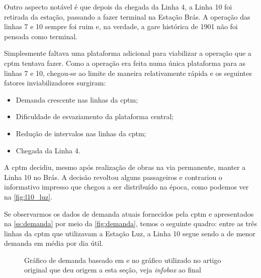 \documentclass[11pt,fleqn]{book} %
\begin{document}
Outro aspecto notável é que depois da chegada da Linha 4, a Linha 10 foi retirada da estação, passando a fazer terminal na Estação Brás. A operação das linhas 7 e 10 sempre foi ruim e, na verdade, a gare histórica de 1901 não foi pensada como terminal.

Simplesmente faltava uma plataforma adicional para viabilizar a operação que a \gls{cptm} tentava fazer. Como a operação era feita numa única plataforma para as linhas 7 e 10, chegou-se ao limite de maneira relativamente rápida e os seguintes fatores inviabilizadores surgiram:

\begin{itemize}
	\item Demanda crescente nas linhas da \gls{cptm};
	\item Dificuldade de esvaziamento da plataforma central;
	\item Redução de intervalos nas linhas da \gls{cptm};
	\item Chegada da Linha 4.
\end{itemize}

A \gls{cptm} decidiu, mesmo após realização de obras na via permanente, manter a Linha 10 no Brás. A decisão revoltou alguns passageiros e contrariou o informativo impresso que chegou a ser distribuído na época, como podemos ver na \autoref{fig:l10_luz}.

Se observarmos os dados de demanda atuais fornecidos pela \gls{cptm} e apresentados na \autoref{ss:demanda} por meio da \autoref{fig:demanda}, temos o seguinte quadro: entre as três linhas da \gls{cptm} que utilizavam a Estação Luz, a Linha 10 segue sendo a de menor demanda em média por dia útil.

\begin{figure}[!htb]
	\centering
	\caption{Gráfico de demanda baseado em \cite{sitecptm1} e no gráfico utilizado no artigo original que deu origem a esta seção, veja \textit{infobox} ao final}
	\label{fig:demanda}
\end{figure}
\end{document}
